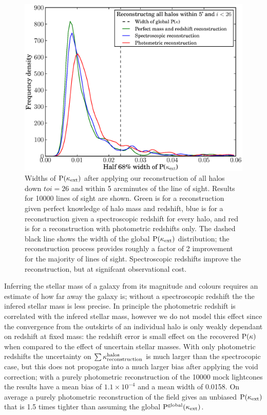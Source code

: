 \documentclass[useAMS,usenatbib]{mn2e}
\begin{document}
\begin{figure}
\includegraphics[width=\columnwidth]{widths.eps}
\caption{Widths of ${\rm P}(\kappa_{\rm ext})$ after applying our reconstruction of all halos down $to i=26$ and within 5 arcminutes of the line of sight. Results for 10000 lines of sight are shown. Green is for a reconstruction given perfect knowledge of halo mass and redshift, blue is for a reconstruction given a spectroscopic redshift for every halo, and red is for a reconstruction with photometric redshifts only. The dashed black line shows the width of the global ${\rm P}(\kappa_{\rm ext})$ distribution; the reconstruction process provides roughly a factor of 2 improvement for the majority of lines of sight. Spectroscopic redshifts improve the reconstruction, but at signifcant observational cost.}
\label{fig:width1}
\end{figure}

Inferring the stellar mass of a galaxy from its magnitude and colours requires an estimate of how far away the galaxy is; without a spectroscopic redshift the the infered stellar mass is less precise. In principle the photometric redshift is correlated with the infered stellar mass, however we do not model this effect since the convergence from the outskirts of an individual halo is only weakly dependant on redshift at fixed mass: the redshift error is small effect on the recovered ${\rm P}(\kappa)$ when compared to the effect of uncertain stellar masses.  With only photometric redshifts the uncertainty on $\sum\kappa_{\rm reconstruction}^{\rm halos}$ is much larger than the spectrocopic case, but this does not propogate into a much larger bias after applying the void correction; with a purely photometric reconstruction of the 10000 mock lightcones the results have a mean bias of $1.1\times 10^{-4}$ and a mean width of 0.0158. On average a purely photometric reconstruction of the field gives an unbiased ${\rm P}(\kappa_{\rm ext})$ that is 1.5 times tighter than assuming the global ${\rm P}^{\rm global}(\kappa_{\rm ext})$. 
\end{document}
